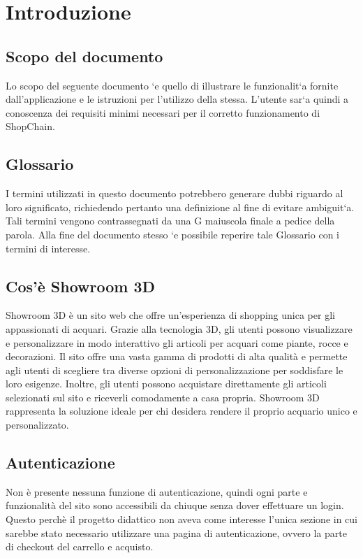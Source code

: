 \section{Introduzione}
\subsection{Scopo del documento}
Lo scopo del seguente documento `e quello di illustrare le funzionalit`a fornite dall’applicazione e le
istruzioni per l’utilizzo della stessa. L’utente sar`a quindi a conoscenza dei requisiti minimi necessari
per il corretto funzionamento di ShopChain.
\subsection{Glossario}
I termini utilizzati in questo documento potrebbero generare dubbi riguardo al loro significato, richiedendo pertanto una definizione al fine di evitare ambiguit`a. Tali termini vengono contrassegnati da
una G maiuscola finale a pedice della parola. Alla fine del documento stesso `e possibile reperire tale
Glossario con i termini di interesse.
\subsection{Cos'è Showroom 3D}
Showroom 3D è un sito web che offre un'esperienza di shopping unica per gli appassionati di acquari. Grazie alla tecnologia 3D, gli utenti possono visualizzare e personalizzare in modo interattivo gli articoli per acquari come piante, rocce e decorazioni. Il sito offre una vasta gamma di prodotti di alta qualità e permette agli utenti di scegliere tra diverse opzioni di personalizzazione per soddisfare le loro esigenze. Inoltre, gli utenti possono acquistare direttamente gli articoli selezionati sul sito e riceverli comodamente a casa propria. Showroom 3D rappresenta la soluzione ideale per chi desidera rendere il proprio acquario unico e personalizzato.
\subsection{Autenticazione}
Non è presente nessuna funzione di autenticazione, quindi ogni parte e funzionalità del sito sono accessibili da chiuque senza dover effettuare un login. 
Questo perchè il progetto didattico non aveva come interesse l'unica sezione in cui sarebbe stato necessario utilizzare una pagina di autenticazione, ovvero la parte di checkout del carrello e acquisto.
